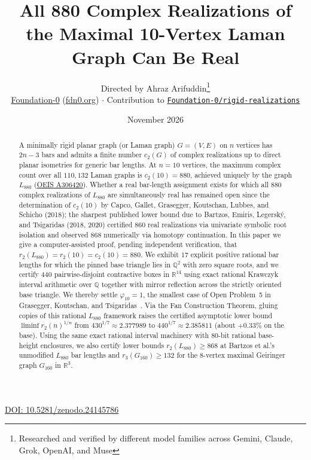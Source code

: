 \documentclass[11pt,a4paper]{article}
\title{\textbf{All 880 Complex Realizations of the Maximal 10-Vertex Laman Graph Can Be Real}}
\author{Directed by Ahraz Arifuddin\thanks{Researched and verified by different model families across Gemini, Claude, Grok, OpenAI, and Muse}\\
\small \href{https://github.com/Foundation-0}{Foundation-0} (\href{https://fdn0.org/}{fdn0.org}) $\cdot$ Contribution to \href{https://github.com/Foundation-0/rigid-realizations}{\texttt{Foundation-0/rigid-realizations}}}
\date{November 2026}
\theoremstyle{definition}
\theoremstyle{remark}
\begin{document}
\maketitle

\noindent\href{https://doi.org/10.5281/zenodo.24145786}{DOI: 10.5281/zenodo.24145786}

\begin{abstract}
A minimally rigid planar graph (or Laman graph) $G = (V, E)$ on $n$ vertices has $2n - 3$ bars and admits a finite number $c_2(G)$ of complex realizations up to direct planar isometries for generic bar lengths. At $n = 10$ vertices, the maximum complex count over all $110{,}132$ Laman graphs is $c_2(10) = 880$, achieved uniquely by the graph $L_{880}$ (\href{https://oeis.org/A306420}{OEIS A306420}). Whether a real bar-length assignment exists for which all $880$ complex realizations of $L_{880}$ are simultaneously real has remained open since the determination of $c_2(10)$ by Capco, Gallet, Grasegger, Koutschan, Lubbes, and Schicho (2018); the sharpest published lower bound due to Bartzos, Emiris, Legersk\'{y}, and Tsigaridas (2018, 2020) certified $860$ real realizations via univariate symbolic root isolation and observed $868$ numerically via homotopy continuation. In this paper we give a computer-assisted proof, pending independent verification, that $r_2(L_{880}) = r_2(10) = c_2(10) = 880$. We exhibit $17$ explicit positive rational bar lengths for which the pinned base triangle lies in $\mathbb{Q}^2$ with zero square roots, and we certify $440$ pairwise-disjoint contractive boxes in $\mathbb{R}^{14}$ using exact rational Krawczyk interval arithmetic over $\mathbb{Q}$ together with mirror reflection across the strictly oriented base triangle. We thereby settle $\varphi_{10} = 1$, the smallest case of Open Problem~5 in Grasegger, Koutschan, and Tsigaridas~\cite{GKT20}. Via the Fan Construction Theorem, gluing copies of this rational $L_{880}$ framework raises the certified asymptotic lower bound $\liminf r_2(n)^{1/n}$ from $430^{1/7} \approx 2.377989$ to $440^{1/7} \approx 2.385811$ (about $+0.33\%$ on the base). Using the same exact rational interval machinery with $80$-bit rational base-height enclosures, we also certify lower bounds $r_2(L_{880}) \ge 868$ at Bartzos et al.'s unmodified $L_{880}$ bar lengths and $r_3(G_{160}) \ge 132$ for the $8$-vertex maximal Geiringer graph $G_{160}$ in $\mathbb{R}^3$.
\end{abstract}
\end{document}
